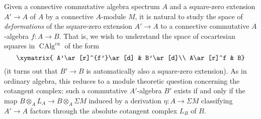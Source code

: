 \documentclass[12pt]{article}
\theoremstyle{definition}
\DeclareMathOperator{\CAlg}{CAlg}
\newcommand{\cn}{\mathrm{cn}}
\begin{document}
Given a connective commutative algebra spectrum $A$ and a square-zero extension $A'\to A$ of $A$ by a connective $A$-module $M$, it is natural to study the space of {\em deformations} of the square-zero extension $A'\to A$ to a connective commutative $A$-algebra $f:A\to B$.
That is, we wish to understand the space of cocartesian squares in $\CAlg^{\cn}$ of the form
\[
\xymatrix{
A'\ar[r]^{f'}\ar[d] & B'\ar[d]\\
A\ar[r]^f & B}
\]
(it turns out that $B'\to B$ is automatically also a square-zero extension).
As in ordinary algebra, this reduces to a module theoretic question concerning the cotangent complex:
such a commutative $A'$-algebra $B'$ exists if and only if the map $B\otimes_A L_A\to  B\otimes_A\Sigma M$ induced by a derivation $\eta:A\to\Sigma M$ classifying $A'\to A$ factors through the absolute cotangent complex $L_B$ of $B$.
\end{document}
